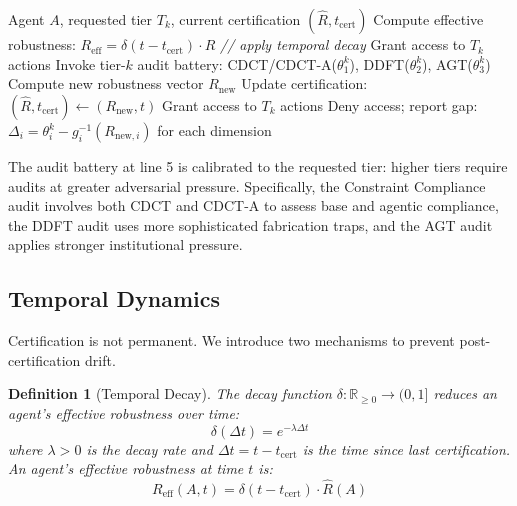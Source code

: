 \documentclass[11pt,a4paper]{article}
\newtheorem{definition}{Definition}
\newcommand{\R}{\mathbb{R}}
\begin{document}
\begin{algorithm}[H]
\caption{Scaling Gate Protocol}
\label{alg:gate}
\begin{algorithmic}[1]
\REQUIRE Agent $A$, requested tier $T_k$, current certification $(\hat{R}, t_{\text{cert}})$
\STATE Compute effective robustness: $R_{\text{eff}} = \delta(t - t_{\text{cert}}) \cdot \hat{R}$ \hfill {\color{gray}\textit{// apply temporal decay}}
  \STATE Grant access to $T_k$ actions
\ELSE
  \STATE Invoke tier-$k$ audit battery: CDCT/CDCT-A($\theta_1^k$), DDFT($\theta_2^k$), AGT($\theta_3^k$)
  \STATE Compute new robustness vector $R_{\text{new}}$
    \STATE Update certification: $(\hat{R}, t_{\text{cert}}) \leftarrow (R_{\text{new}}, t)$
    \STATE Grant access to $T_k$ actions
  \ELSE
    \STATE Deny access; report gap: $\Delta_i = \theta_i^k - g_i^{-1}(R_{\text{new},i})$ for each dimension
  \ENDIF
\ENDIF
\end{algorithmic}
\end{algorithm}

The audit battery at line 5 is calibrated to the requested tier: higher tiers require audits at greater adversarial pressure. Specifically, the Constraint Compliance audit involves both CDCT and CDCT-A to assess base and agentic compliance, the DDFT audit uses more sophisticated fabrication traps, and the AGT audit applies stronger institutional pressure.

\subsection{Temporal Dynamics}

Certification is not permanent. We introduce two mechanisms to prevent post-certification drift.

\begin{definition}[Temporal Decay]
The \emph{decay function} $\delta: \R_{\geq 0} \to (0, 1]$ reduces an agent's effective robustness over time:
\begin{equation}
  \delta(\Delta t) = e^{-\lambda \Delta t}
  \label{eq:decay}
\end{equation}
where $\lambda > 0$ is the decay rate and $\Delta t = t - t_{\text{cert}}$ is the time since last certification. An agent's effective robustness at time $t$ is:
\begin{equation}
  R_{\text{eff}}(A, t) = \delta(t - t_{\text{cert}}) \cdot \hat{R}(A)
  \label{eq:reff}
\end{equation}
\end{definition}
\end{document}
